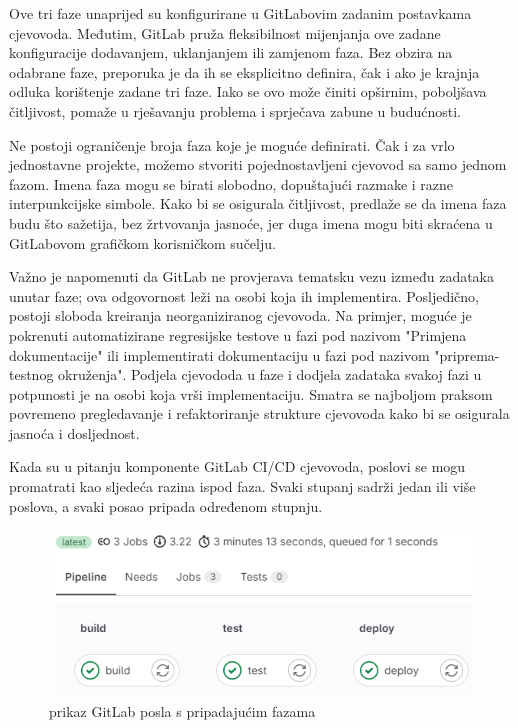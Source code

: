 \documentclass[a4paper,12pt,oneside]{article}
\begin{document}
Ove tri faze unaprijed su konfigurirane u GitLabovim zadanim postavkama cjevovoda. Međutim, GitLab pruža fleksibilnost mijenjanja ove zadane konfiguracije dodavanjem, uklanjanjem ili zamjenom faza. Bez obzira na odabrane faze, preporuka je da ih se eksplicitno definira, čak i ako je krajnja odluka korištenje zadane tri faze. Iako se ovo može činiti opširnim, poboljšava čitljivost, pomaže u rješavanju problema i sprječava zabune u budućnosti.

Ne postoji ograničenje broja faza koje je moguće definirati. Čak i za vrlo jednostavne projekte, možemo stvoriti pojednostavljeni cjevovod sa samo jednom fazom. Imena faza mogu se birati slobodno, dopuštajući razmake i razne interpunkcijske simbole. Kako bi se osigurala čitljivost, predlaže se da imena faza budu što  sažetija, bez žrtvovanja jasnoće, jer duga imena mogu biti skraćena u GitLabovom grafičkom korisničkom sučelju.

Važno je napomenuti da GitLab ne provjerava tematsku vezu između zadataka unutar faze; ova odgovornost leži na osobi koja ih implementira. Posljedično, postoji sloboda kreiranja neorganiziranog cjevovoda. Na primjer, moguće je pokrenuti automatizirane regresijske testove u fazi pod nazivom "Primjena dokumentacije" ili implementirati dokumentaciju u fazi pod nazivom "priprema-testnog okruženja". Podjela cjevododa u faze i dodjela zadataka svakoj fazi u potpunosti je na osobi koja vrši implementaciju. Smatra se najboljom praksom povremeno pregledavanje i refaktoriranje strukture cjevovoda kako bi se osigurala jasnoća i dosljednost.


Kada su u pitanju komponente GitLab CI/CD cjevovoda, poslovi se mogu promatrati kao sljedeća razina ispod faza. Svaki stupanj sadrži jedan ili više poslova, a svaki posao pripada određenom stupnju.

\begin{figure}[ht!] %
	\centering %
	\includegraphics[scale=0.5]{./Slike/gitlab ci job overview main branch.png} %
	\caption{prikaz GitLab posla s pripadajućim fazama \label{f:prikaz Gitlab posla s pripadajućim fazama}} %
\end{figure}
\end{document}
